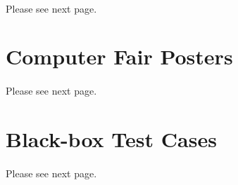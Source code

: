 \documentclass[12pt,a4paper]{article}
\begin{document}
\begin{appendices}
        \paragraph{} Please see next page.
        
        
      \section{Computer Fair Posters}\label{appendix:computer-fair-posters}
        \paragraph{} Please see next page.
        
        
        
      
      \section{Black-box Test Cases}\label{appendix:black-box-test-cases}
        \paragraph{} Please see next page.
        
    \end{appendices}

  
\end{document}
